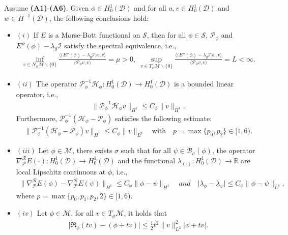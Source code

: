 \documentclass[10pt,a4paper]{amsart}
\begin{document}
\begin{prop}\label{Property-P}
	Assume {\rm \textbf{(A1)}}-{\rm \textbf{(A6)}}. Given $\phi\in H_0^1(\mathcal{D})$ and for all $u, v\in H_0^1(\mathcal{D})$ and $w\in H^{-1}(\mathcal{D})$, the following conclusions hold:
	\begin{itemize}[label={}, labelsep=0pt, leftmargin=*]
		\item $(i)$ If $E$ is a
		Morse-Bott functional on $\mathcal{S}$, then for all $\phi\in\mathcal{S}$, $\mathcal{P}_{\phi}$ and $E''(\phi)-\lambda_g\mathcal{I}$ satisfy the spectral equivalence, i.e.,
		\begin{align}\label{Mu-L}
			\inf_{v\in N_{\phi}\mathcal{M}\backslash\{0\}}\frac{\big\langle \big(E''(\phi)-\lambda_g\mathcal{I}\big)v,v\big\rangle}{\big\langle\mathcal{P}_{\phi}v,v\big\rangle}=\mu>0,\;\sup_{v\in T_{\phi}\mathcal{M}\backslash\{0\}}\frac{\big\langle \big(E''(\phi)-\lambda_g\mathcal{I}\big)v,v\big\rangle}{\big\langle\mathcal{P}_{\phi}v,v\big\rangle}=L<\infty.
		\end{align}
		\item $(ii)$ {The operator} $\mathcal{P}^{-1}_{\phi}\mathcal{H}_{\phi}:H_0^1(\mathcal{D})\to H_0^1(\mathcal{D})$ is a bounded linear operator, i.e., 
		\begin{align*}
			\big\|\mathcal{P}^{-1}_{\phi}\mathcal{H}_{\phi}v\big\|_{H^1}\le C_{\phi}\|v\|_{H^{1}}.
		\end{align*}
		Furthermore, $\mathcal{P}_{\phi}^{-1}(\mathcal{H}_{\phi}-\mathcal{P}_{\phi})$ satisfies the following estimate:
		\begin{align*}
			\big\|\mathcal{P}_{\phi}^{-1}(\mathcal{H}_{\phi}-\mathcal{P}_{\phi})v\big\|_{H^1}\le C_{\phi}\|v\|_{L^{p}}\quad\text{with}\quad {p=\max\{p_0,p_2\}\in[1,6)}.
		\end{align*}
		\item $(iii)$ Let $\phi\in\mathcal{M}$, there exists $\sigma$ such that for all $\psi\in\mathcal{B}_{\sigma}(\phi)$, the operator $\nabla^{\mathcal{R}}_{\mathcal{P}} E(\cdot):H_0^1(\mathcal{D})\to H_0^1(\mathcal{D})$ and the functional $\lambda_{(\cdot)}:H^1_0(\mathcal{D})\to \mathbb{R}$ are local Lipschitz continuous at $\phi$, i.e., 
		\begin{align*}
			\big\|\nabla^{\mathcal{R}}_{\mathcal{P}} E(\phi)-\nabla^{\mathcal{R}}_{\mathcal{P}} E(\psi)\big\|_{H^1}\le C_{\phi}\|\phi-\psi\|_{H^1}\quad and\quad \big|\lambda_{\phi}-\lambda_{\psi}\big|\le C_{\phi}\|\phi-\psi\|_{L^p},
		\end{align*}
		where $p=\max\{p_0,p_1,p_2,2\}\in[1,6)$.
		\item $(iv)$ Let $\phi\in\mathcal{M}$, for all $v\in T_{\phi}\mathcal{M}$, it holds that
		\begin{align*}
			\big|\mathfrak{R}_{\phi}(tv)-(\phi+tv)\big|\le\frac{1}{2}t^2\|v\|^2_{L^2}|\phi+tv|.
		\end{align*}
	\end{itemize}
\end{prop}
\end{document}
